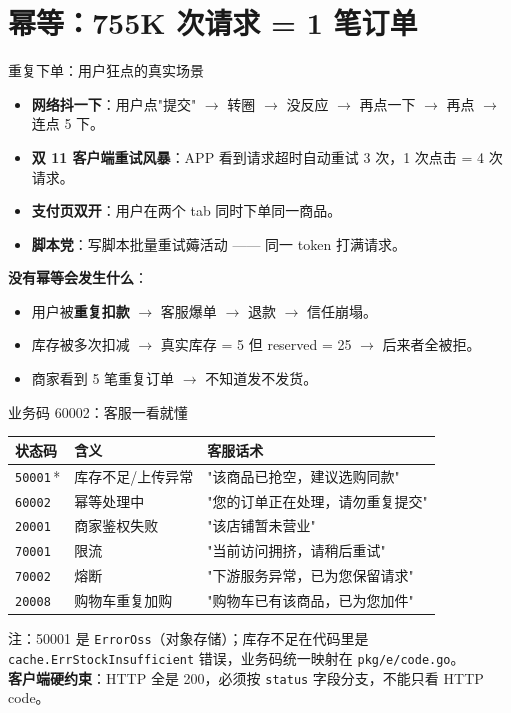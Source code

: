 \documentclass[aspectratio=169,11pt]{beamer}
\begin{document}
\section{幂等：755K 次请求 = 1 笔订单}

\begin{frame}[shrink]{重复下单：用户狂点的真实场景}
\begin{itemize}
  \item \textbf{网络抖一下}：用户点"提交" $\to$ 转圈 $\to$ 没反应 $\to$ 再点一下 $\to$ 再点 $\to$ 连点 5 下。
  \item \textbf{双 11 客户端重试风暴}：APP 看到请求超时自动重试 3 次，1 次点击 = 4 次请求。
  \item \textbf{支付页双开}：用户在两个 tab 同时下单同一商品。
  \item \textbf{脚本党}：写脚本批量重试薅活动 —— 同一 token 打满请求。
\end{itemize}
\vspace{2mm}
\textbf{没有幂等会发生什么}：
\begin{itemize}
  \item 用户被\textbf{重复扣款} $\to$ 客服爆单 $\to$ 退款 $\to$ 信任崩塌。
  \item 库存被多次扣减 $\to$ 真实库存 = 5 但 reserved = 25 $\to$ 后来者全被拒。
  \item 商家看到 5 笔重复订单 $\to$ 不知道发不发货。
\end{itemize}
\end{frame}

\begin{frame}[shrink]{业务码 60002：客服一看就懂}
\begin{tabular}{@{}lll@{}}
\toprule
状态码 & 含义        & 客服话术 \\
\midrule
\texttt{50001}\,*  & 库存不足/上传异常  & "该商品已抢空，建议选购同款" \\
\texttt{60002}     & 幂等处理中        & "您的订单正在处理，请勿重复提交" \\
\texttt{20001}     & 商家鉴权失败      & "该店铺暂未营业" \\
\texttt{70001}     & 限流              & "当前访问拥挤，请稍后重试" \\
\texttt{70002}     & 熔断              & "下游服务异常，已为您保留请求" \\
\texttt{20008}     & 购物车重复加购    & "购物车已有该商品，已为您加件" \\
\bottomrule
\end{tabular}
\vspace{2mm}
\small *注：50001 是 \texttt{ErrorOss}（对象存储）；库存不足在代码里是 \texttt{cache.ErrStockInsufficient} 错误，业务码统一映射在 \texttt{pkg/e/code.go}。\\
\textbf{客户端硬约束}：HTTP 全是 200，必须按 \texttt{status} 字段分支，不能只看 HTTP code。
\end{frame}
\end{document}
